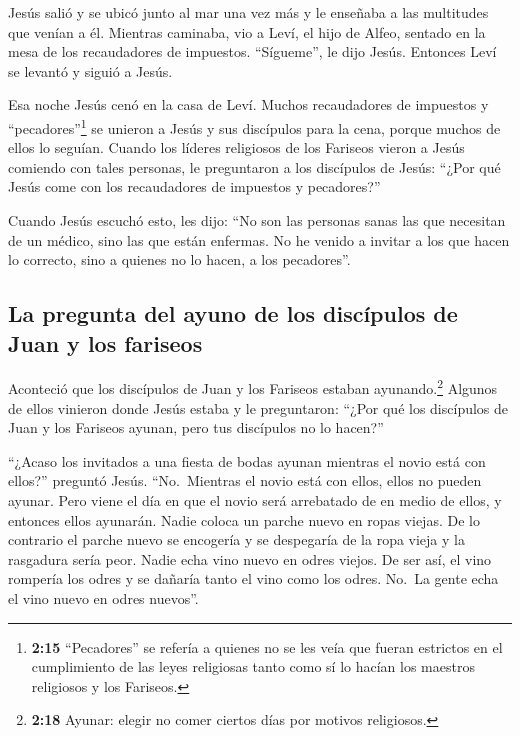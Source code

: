  Jesús salió y se ubicó junto al mar una vez más y le
enseñaba a las multitudes que venían a él.  Mientras
caminaba, vio a Leví, el hijo de Alfeo, sentado en la mesa de los
recaudadores de impuestos. ``Sígueme'', le dijo Jesús. Entonces Leví se
levantó y siguió a Jesús.

 Esa noche Jesús cenó en la casa de Leví. Muchos
recaudadores de impuestos y ``pecadores''\footnote{\textbf{2:15}
  ``Pecadores'' se refería a quienes no se les veía que fueran estrictos
  en el cumplimiento de las leyes religiosas tanto como sí lo hacían los
  maestros religiosos y los Fariseos.} se unieron a Jesús y sus
discípulos para la cena, porque muchos de ellos lo seguían.
 Cuando los líderes religiosos de los Fariseos vieron a
Jesús comiendo con tales personas, le preguntaron a los discípulos de
Jesús: ``¿Por qué Jesús come con los recaudadores de impuestos y
pecadores?''

 Cuando Jesús escuchó esto, les dijo: ``No son las
personas sanas las que necesitan de un médico, sino las que están
enfermas. No he venido a invitar a los que hacen lo correcto, sino a
quienes no lo hacen, a los pecadores''.

\hypertarget{la-pregunta-del-ayuno-de-los-discuxedpulos-de-juan-y-los-fariseos}{%
\subsection{La pregunta del ayuno de los discípulos de Juan y los
fariseos}\label{la-pregunta-del-ayuno-de-los-discuxedpulos-de-juan-y-los-fariseos}}

 Aconteció que los discípulos de Juan y los Fariseos
estaban ayunando.\footnote{\textbf{2:18} Ayunar: elegir no comer ciertos
  días por motivos religiosos.} Algunos de ellos vinieron donde Jesús
estaba y le preguntaron: ``¿Por qué los discípulos de Juan y los
Fariseos ayunan, pero tus discípulos no lo hacen?''

 ``¿Acaso los invitados a una fiesta de bodas ayunan
mientras el novio está con ellos?'' preguntó Jesús. ``No.~Mientras el
novio está con ellos, ellos no pueden ayunar.  Pero viene
el día en que el novio será arrebatado de en medio de ellos, y entonces
ellos ayunarán.  Nadie coloca un parche nuevo en ropas
viejas. De lo contrario el parche nuevo se encogería y se despegaría de
la ropa vieja y la rasgadura sería peor.  Nadie echa vino
nuevo en odres viejos. De ser así, el vino rompería los odres y se
dañaría tanto el vino como los odres. No.~La gente echa el vino nuevo en
odres nuevos''.


